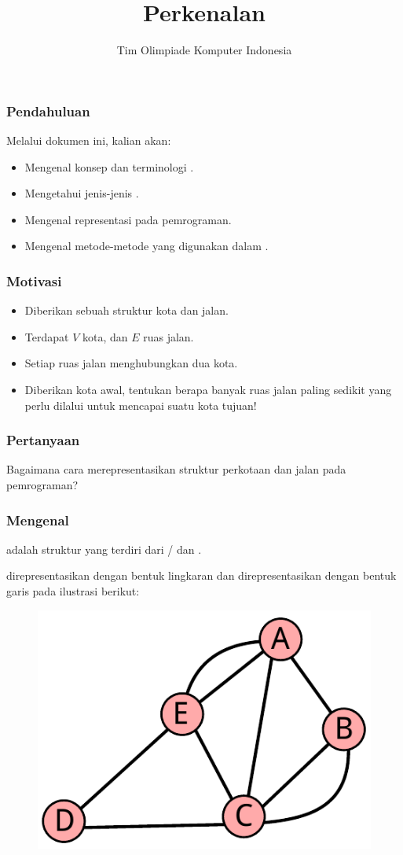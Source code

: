 

\title{Perkenalan \fGraph}
\author{Tim Olimpiade Komputer Indonesia}
\date{}

\usepackage{verbatim}
\usepackage{multicol}



\begin{frame}
\titlepage
\end{frame}

\begin{frame}
\frametitle{Pendahuluan}
Melalui dokumen ini, kalian akan:
\begin{itemize}
  \item Mengenal konsep dan terminologi \fgraph.
  \item Mengetahui jenis-jenis \fgraph.
  \item Mengenal representasi \fgraph pada pemrograman.
  \item Mengenal metode-metode yang digunakan dalam \fgraph.
\end{itemize}
\end{frame}

\begin{frame}
\frametitle{Motivasi}
\begin{itemize}
  \item Diberikan sebuah struktur kota dan jalan.
  \item Terdapat $V$ kota, dan $E$ ruas jalan.
  \item Setiap ruas jalan menghubungkan dua kota.
  \item Diberikan kota awal, tentukan berapa banyak ruas jalan paling sedikit yang perlu dilalui untuk mencapai suatu kota tujuan!
\end{itemize}
\end{frame}

\begin{frame}
\frametitle{Pertanyaan}
\begin{center}
  \large Bagaimana cara merepresentasikan struktur perkotaan dan jalan pada pemrograman?
\end{center}
\end{frame}

\begin{frame}
\frametitle{Mengenal \fGraph}
\fGraph adalah struktur yang terdiri dari \alert{\fnode/} dan \alert{\fedge.}\newline

\fNode direpresentasikan dengan bentuk lingkaran dan \fedge direpresentasikan dengan bentuk garis pada ilustrasi berikut:

\begin{figure}
  \centering
  \includegraphics[width=4 cm]{asset/graph.pdf}
\end{figure}
\end{frame}

